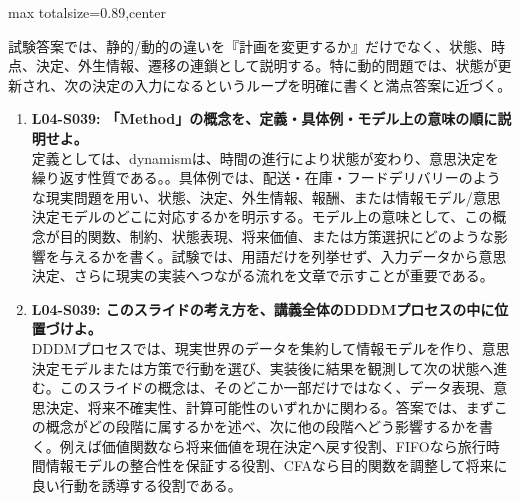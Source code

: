 \begin{minipage}[t]{0.58\textwidth}
\begin{adjustbox}{max totalsize={\textwidth}{0.89\textheight},center}
\begin{minipage}{\textwidth}
試験答案では、静的/動的の違いを『計画を変更するか』だけでなく、状態、時点、決定、外生情報、遷移の連鎖として説明する。特に動的問題では、状態が更新され、次の決定の入力になるというループを明確に書くと満点答案に近づく。\par{}\begin{enumerate}\item \textbf{L04-S039: 「Method」の概念を、定義・具体例・モデル上の意味の順に説明せよ。}\\定義としては、dynamismは、時間の進行により状態が変わり、意思決定を繰り返す性質である。。具体例では、配送・在庫・フードデリバリーのような現実問題を用い、状態、決定、外生情報、報酬、または情報モデル/意思決定モデルのどこに対応するかを明示する。モデル上の意味として、この概念が目的関数、制約、状態表現、将来価値、または方策選択にどのような影響を与えるかを書く。試験では、用語だけを列挙せず、入力データから意思決定、さらに現実の実装へつながる流れを文章で示すことが重要である。\item \textbf{L04-S039: このスライドの考え方を、講義全体のDDDMプロセスの中に位置づけよ。}\\DDDMプロセスでは、現実世界のデータを集約して情報モデルを作り、意思決定モデルまたは方策で行動を選び、実装後に結果を観測して次の状態へ進む。このスライドの概念は、そのどこか一部だけではなく、データ表現、意思決定、将来不確実性、計算可能性のいずれかに関わる。答案では、まずこの概念がどの段階に属するかを述べ、次に他の段階へどう影響するかを書く。例えば価値関数なら将来価値を現在決定へ戻す役割、FIFOなら旅行時間情報モデルの整合性を保証する役割、CFAなら目的関数を調整して将来に良い行動を誘導する役割である。\end{enumerate}
\end{minipage}
\end{adjustbox}
\end{minipage}


